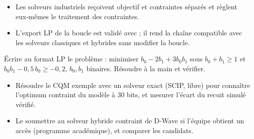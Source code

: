 \begin{resultat}
\begin{itemize}
\item Les solveurs industriels reçoivent objectif et contraintes séparés et règlent eux-mêmes le traitement des contraintes.
\item L'export LP de la boucle est validé avec  ; il rend la chaîne compatible avec les solveurs classiques et hybrides sans modifier la boucle.
\end{itemize}
\end{resultat}

\exercices
\begin{exercice}\label{ex:cqm-ecrire}
Écrire au format LP le problème : minimiser $b_0-2b_1+3b_0b_1$ sous $b_0+b_1\ge1$ et $b_0b_1-0{,}5\,b_0\ge-0{,}2$, $b_0,b_1$ binaires. Résoudre à la main et vérifier.
\end{exercice}

\begin{pistes}
\begin{itemize}
\item Résoudre le CQM exemple avec un solveur exact (SCIP, libre) pour connaître l'optimum contraint du modèle à 30 bits, et mesurer l'écart du recuit simulé vérifié.
\item Le soumettre au solveur hybride contraint de D-Wave si l'équipe obtient un accès (programme académique), et comparer les candidats.
\end{itemize}
\end{pistes}
